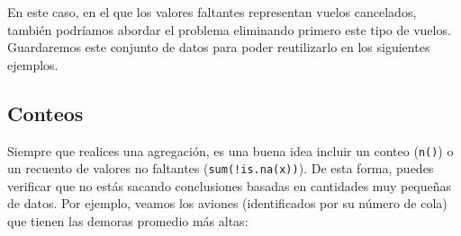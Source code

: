 \documentclass[11pt,oneside]{report}
\newenvironment{Shaded}{\begin{snugshade}}{\end{snugshade}}
\newcommand{\CommentTok}[1]{\textcolor[rgb]{0.56,0.35,0.01}{\textit{#1}}}
\newcommand{\DataTypeTok}[1]{\textcolor[rgb]{0.13,0.29,0.53}{#1}}
\newcommand{\DecValTok}[1]{\textcolor[rgb]{0.00,0.00,0.81}{#1}}
\newcommand{\KeywordTok}[1]{\textcolor[rgb]{0.13,0.29,0.53}{\textbf{#1}}}
\newcommand{\NormalTok}[1]{#1}
\newcommand{\OperatorTok}[1]{\textcolor[rgb]{0.81,0.36,0.00}{\textbf{#1}}}
\newcommand{\StringTok}[1]{\textcolor[rgb]{0.31,0.60,0.02}{#1}}
\begin{document}
En este caso, en el que los valores faltantes representan vuelos
cancelados, también podríamos abordar el problema eliminando primero
este tipo de vuelos. Guardaremos este conjunto de datos para poder
reutilizarlo en los siguientes ejemplos.

\begin{Shaded}
\end{Shaded}

\hypertarget{conteos}{%
\subsection{Conteos}\label{conteos}}

Siempre que realices una agregación, es una buena idea incluir un conteo
(\texttt{n()}) o un recuento de valores no faltantes
(\texttt{sum(!is.na(x))}). De esta forma, puedes verificar que no estás
sacando conclusiones basadas en cantidades muy pequeñas de datos. Por
ejemplo, veamos los aviones (identificados por su número de cola) que
tienen las demoras promedio más altas:

\begin{Shaded}
\end{Shaded}
\end{document}
